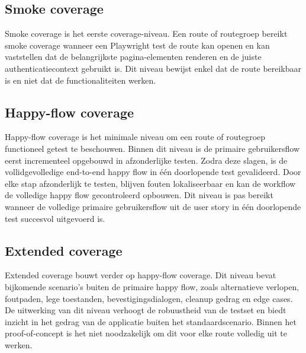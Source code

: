\subsection{Smoke coverage}

Smoke coverage is het eerste coverage-niveau. Een route of routegroep bereikt smoke coverage wanneer een Playwright test de route kan openen en kan vaststellen dat de belangrijkste pagina-elementen renderen en de juiste authenticatiecontext gebruikt is. Dit niveau bewijst enkel dat de route bereikbaar is en niet dat de functionaliteiten werken. 

\subsection{Happy-flow coverage}

Happy-flow coverage is het minimale niveau om een route of routegroep functioneel getest te beschouwen. Binnen dit niveau is de primaire gebruikersflow eerst incrementeel opgebouwd in afzonderlijke testen. Zodra deze slagen, is de vollidgevolledige end-to-end happy flow in één doorlopende test gevalideerd. Door elke stap afzonderlijk te testen, blijven fouten lokaliseerbaar en kan de workflow de volledige happy flow gecontroleerd opbouwen. Dit niveau is pas bereikt wanneer de volledige primaire gebruikersflow uit de user story in één doorlopende test succesvol uitgevoerd is.

\subsection{Extended coverage}

Extended coverage bouwt verder op happy-flow coverage. Dit niveau bevat bijkomende scenario's buiten de primaire happy flow, zoals alternatieve verlopen, foutpaden, lege toestanden, bevestigingsdialogen, cleanup gedrag en edge cases. De uitwerking van dit niveau verhoogt de robuustheid van de testset en biedt inzicht in het gedrag van de applicatie buiten het standaardscenario. Binnen het proof-of-concept is het niet noodzakelijk om dit voor elke route volledig uit te werken.

